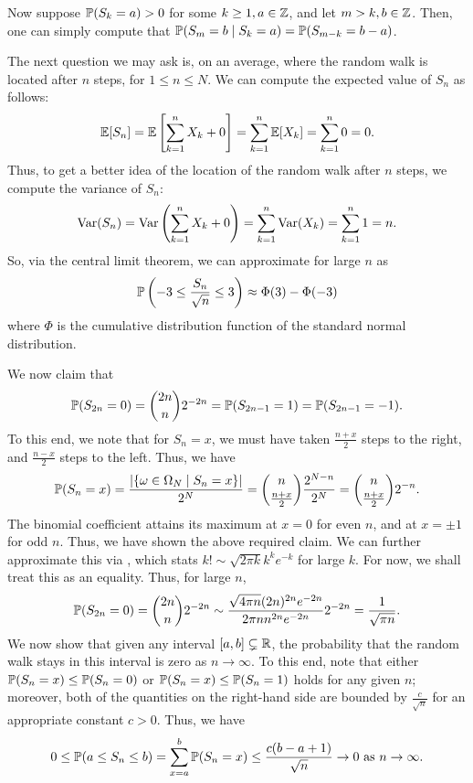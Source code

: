 Now suppose $\mathbb{P}(S_{k}=a) > 0$ for some $k \geq 1,a \in \mathbb{Z}$, and let $m > k,b \in \mathbb{Z}$. Then, one can simply compute that $\mathbb{P}(S_{m}=b \mid S_{k}=a) = \mathbb{P}(S_{m-k}=b-a)$.

The next question we may ask is, on an average, where the random walk is located after $n$ steps, for $1 \leq n \leq N$. We can compute the expected value of $S_{n}$ as follows:
\begin{align}
    \mathbb{E}[S_{n}] = \mathbb{E}\left[\sum_{k=1}^{n} X_{k}+0\right] = \sum_{k=1}^{n} \mathbb{E}[X_{k}] = \sum_{k=1}^{n} 0 = 0. 
\end{align}
Thus, to get a better idea of the location of the random walk after $n$ steps, we compute the variance of $S_{n}$:
\begin{align}
    \operatorname{Var}(S_{n}) = \operatorname{Var}\left(\sum_{k=1}^{n} X_{k}+0\right) = \sum_{k=1}^{n} \operatorname{Var}(X_{k}) = \sum_{k=1}^{n} 1 = n.
\end{align}
So, via the central limit theorem, we can approximate for large $n$ as
\begin{align}
    \mathbb{P}\left( -3 \leq \frac{S_{n}}{\sqrt{n}} \leq 3 \right) \approx \Phi(3) - \Phi(-3)
\end{align}
where $\Phi$ is the cumulative distribution function of the standard normal distribution.

We now claim that
\begin{align}
    \mathbb{P}(S_{2n}=0) = \binom{2n}{n} 2^{-2n} = \mathbb{P}(S_{2n-1}=1) = \mathbb{P}(S_{2n-1}=-1).
\end{align}
To this end, we note that for $S_{n} = x$, we must have taken $\frac{n+x}{2}$ steps to the right, and $\frac{n-x}{2}$ steps to the left. Thus, we have
\begin{align}
    \mathbb{P}(S_{n}=x) = \frac{\left| \{\omega \in \Omega_{N} \mid S_{n} = x\} \right|}{2^{N}} = \binom{n}{\frac{n+x}{2}} \frac{2^{N-n}}{2^{N}} = \binom{n}{\frac{n+x}{2}} 2^{-n}.
\end{align}
The binomial coefficient attains its maximum at $x=0$ for even $n$, and at $x=\pm 1$ for odd $n$. Thus, we have shown the above required claim. We can further approximate this via , which stats $k! \sim \sqrt{2\pi k} k^{k}e^{-k}$ for large $k$. For now, we shall treat this as an equality. Thus, for large $n$,
\begin{align}
    \mathbb{P}(S_{2n}=0) = \binom{2n}{n} 2^{-2n} \sim \frac{\sqrt{4\pi n}(2n)^{2n}e^{-2n}}{2\pi n n^{2n} e^{-2n}} 2^{-2n} = \frac{1}{\sqrt{\pi n}}.
\end{align}
We now show that given any interval $[a,b] \subsetneq \mathbb{R}$, the probability that the random walk stays in this interval is zero as $n \to \infty$. To this end, note that either $\mathbb{P}(S_{n}=x) \leq \mathbb{P}(S_{n}=0)$ or $\mathbb{P}(S_{n}=x) \leq \mathbb{P}(S_{n}=1)$ holds for any given $n$; moreover, both of the quantities on the right-hand side are bounded by $\frac{c}{\sqrt{n}}$ for an appropriate constant $c > 0$. Thus, we have
\begin{align}
    0 \leq \mathbb{P}(a \leq S_{n} \leq b) = \sum_{x=a}^{b} \mathbb{P}(S_{n}=x) \leq \frac{c(b-a+1)}{\sqrt{n}} \to 0 \text{ as } n \to \infty.
\end{align}


